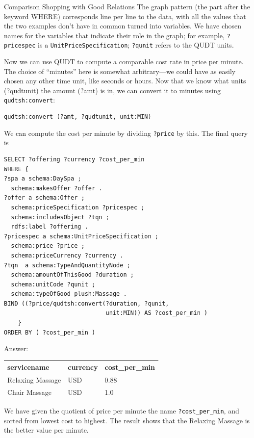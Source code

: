 \begin{challenge}{Comparison Shopping with Good Relations}
The graph pattern (the part after the keyword WHERE) corresponds line
per line to the data, with all the values that the two examples don't
have in common turned into variables. We have chosen names for the
variables that indicate their role in the graph; for example, \texttt{?pricespec}
is a \texttt{UnitPriceSpecification}; \texttt{?qunit} refers to the QUDT units.

Now we can use QUDT to compute a comparable cost rate in price per
minute. The choice of ``minutes'' here is somewhat arbitrary---we could
have as easily chosen any other time unit, like seconds or hours. Now
that we know what units (?qudtunit) the amount (?amt) is in, we can
convert it to minutes using \texttt{qudtsh:convert}:

\begin{lstlisting}
qudtsh:convert (?amt, ?qudtunit, unit:MIN)
\end{lstlisting}

We can compute the cost per minute by dividing \texttt{?price} by this. The final
query is

\begin{lstlisting}
SELECT ?offering ?currency ?cost_per_min
WHERE {
?spa a schema:DaySpa ;
  schema:makesOffer ?offer .
?offer a schema:Offer ;
  schema:priceSpecification ?pricespec ;
  schema:includesObject ?tqn ;
  rdfs:label ?offering .
?pricespec a schema:UnitPriceSpecification ;
  schema:price ?price ;
  schema:priceCurrency ?currency .
?tqn  a schema:TypeAndQuantityNode ;
  schema:amountOfThisGood ?duration ;
  schema:unitCode ?qunit ;  
  schema:typeOfGood plush:Massage .
BIND ((?price/qudtsh:convert(?duration, ?qunit,
                             unit:MIN)) AS ?cost_per_min )
    }
ORDER BY ( ?cost_per_min )
\end{lstlisting}

Answer:

\begin{tabular}{|lll|}
\hline
servicename&currency&cost\_per\_min\\
\hline
Relaxing Massage&USD&0.88\\
Chair Massage&USD&1.0\\
\hline
\end{tabular}

We have given the quotient of price per minute the name \texttt{?cost\_per\_min},
and sorted from lowest cost to highest. The result shows that the
Relaxing Massage is the better value per minute.
\end{challenge}

